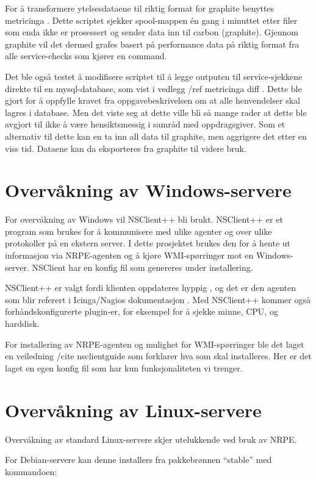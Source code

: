 For å transformere ytelsesdataene til riktig format for graphite benyttes metricinga \cite{metricinga}. Dette scriptet sjekker spool-mappen én gang i minuttet etter filer som enda ikke er prosessert og sender data inn til carbon (graphite). 
Gjennom graphite vil det dermed grafes basert på performance data på riktig format fra alle service-checks som kjører en command.

Det ble også testet å modifisere scriptet til å legge outputen til service-sjekkene direkte til en mysql-database, som vist i vedlegg /ref metricinga diff . Dette ble gjort for å oppfylle kravet fra oppgavebeskrivelsen om at alle henvendelser skal lagres i database. Men det viste seg at dette ville bli så mange rader at dette ble avgjort til ikke å være hensiktsmessig i samråd med oppdragsgiver. Som et alternativ til dette kan en ta inn all data til graphite, men aggrigere det etter en viss tid. Dataene kan da eksporteres fra graphite til videre bruk.

\section{Overvåkning av Windows-servere}
For overvåkning av Windows vil NSClient++ bli brukt. NSClient++ er et program som brukes for  å kommunisere med ulike agenter og over ulike protokoller på en ekstern server. I dette prosjektet brukes den for å hente ut informasjon via NRPE-agenten og å kjøre WMI-spørringer mot en Windows-server. NSClient har en konfig fil som genereres under installering. 

NSClient++ er valgt fordi klienten oppdateres hyppig \cite{nsclient}, og det er den agenten som blir referert i Icinga/Nagios dokumentasjon \cite{icingawin}. Med NSClient++ kommer også forhåndskonfigurerte plugin-er, for eksempel for å sjekke minne, CPU, og harddisk.

For installering av NRPE-agenten og mulighet for WMI-spørringer ble det laget en veiledning /cite nsclientguide  som forklarer hva som skal installeres. Her er det laget en egen konfig fil som har kun funksjonaliteten vi trenger. 

\section{Overvåkning av Linux-servere}
Overvåkning av standard Linux-servere skjer utelukkende ved bruk av NRPE. 

For Debian-servere kan denne installers fra pakkebrønnen “stable” med kommandoen:

